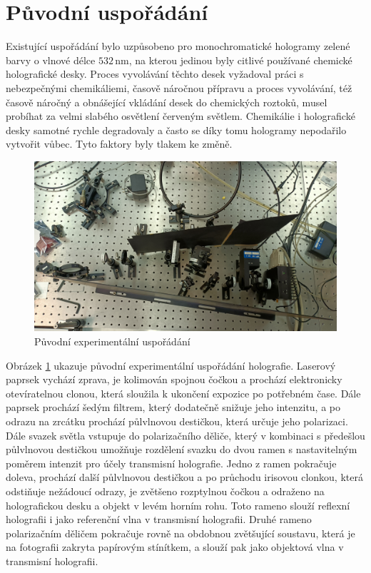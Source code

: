\documentclass[twoside,project]{../MFFPrace}
\begin{document}
\section{Původní uspořádání}
Existující uspořádání bylo uzpůsobeno pro monochromatické hologramy zelené barvy o vlnové délce $532\,\text{nm}$, na kterou jedinou byly citlivé používané chemické holografické desky. Proces vyvolávání těchto desek vyžadoval práci s nebezpečnými chemikáliemi, časově náročnou přípravu a proces vyvolávání, též časově náročný a obnášející vkládání desek do chemických roztoků, musel probíhat za velmi slabého osvětlení červeným světlem. Chemikálie i holografické desky samotné rychle degradovaly a často se díky tomu hologramy nepodařilo vytvořit vůbec. Tyto faktory byly tlakem ke změně.

\begin{figure}
    \includegraphics[width=\linewidth]{../img/stare-usporadani.jpg}
    \caption{Původní experimentální uspořádání}
    \label{img:puvodni-usporadani}
\end{figure}

Obrázek \ref{img:puvodni-usporadani} ukazuje původní experimentální uspořádání holografie. Laserový paprsek vychází zprava, je kolimován spojnou čočkou a prochází elektronicky otevíratelnou clonou, která sloužila k ukončení expozice po potřebném čase. Dále paprsek prochází šedým filtrem, který dodatečně snižuje jeho intenzitu, a po odrazu na zrcátku prochází půlvlnovou destičkou, která určuje jeho polarizaci. Dále svazek světla vstupuje do polarizačního děliče, který v kombinaci s předešlou půlvlnovou destičkou umožňuje rozdělení svazku do dvou ramen s nastavitelným poměrem intenzit pro účely transmisní holografie. Jedno z ramen pokračuje doleva, prochází další půlvlnovou destičkou a po průchodu irisovou clonkou, která odstiňuje nežádoucí odrazy, je zvětšeno rozptylnou čočkou a odraženo na holografickou desku a objekt v levém horním rohu. Toto rameno slouží reflexní holografii i jako referenční vlna v transmisní holografii. Druhé rameno polarizačním děličem pokračuje rovně na obdobnou zvětšující soustavu, která je na fotografii zakryta papírovým stínítkem, a slouží pak jako objektová vlna v transmisní holografii.
\end{document}
